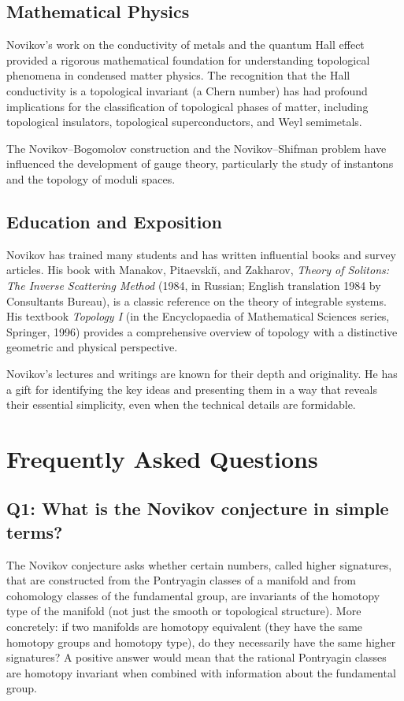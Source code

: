 \subsection{Mathematical Physics}

Novikov's work on the conductivity of metals and the quantum Hall effect provided a rigorous mathematical foundation for understanding topological phenomena in condensed matter physics. The recognition that the Hall conductivity is a topological invariant (a Chern number) has had profound implications for the classification of topological phases of matter, including topological insulators, topological superconductors, and Weyl semimetals.

The Novikov--Bogomolov construction and the Novikov--Shifman problem have influenced the development of gauge theory, particularly the study of instantons and the topology of moduli spaces.

\subsection{Education and Exposition}

Novikov has trained many students and has written influential books and survey articles. His book with Manakov, Pitaevski\u\i, and Zakharov, \textit{Theory of Solitons: The Inverse Scattering Method} (1984, in Russian; English translation 1984 by Consultants Bureau), is a classic reference on the theory of integrable systems. His textbook \textit{Topology I} (in the Encyclopaedia of Mathematical Sciences series, Springer, 1996) provides a comprehensive overview of topology with a distinctive geometric and physical perspective.

Novikov's lectures and writings are known for their depth and originality. He has a gift for identifying the key ideas and presenting them in a way that reveals their essential simplicity, even when the technical details are formidable.

\section{Frequently Asked Questions}

\subsection*{Q1: What is the Novikov conjecture in simple terms?}

The Novikov conjecture asks whether certain numbers, called higher signatures, that are constructed from the Pontryagin classes of a manifold and from cohomology classes of the fundamental group, are invariants of the homotopy type of the manifold (not just the smooth or topological structure). More concretely: if two manifolds are homotopy equivalent (they have the same homotopy groups and homotopy type), do they necessarily have the same higher signatures? A positive answer would mean that the rational Pontryagin classes are homotopy invariant when combined with information about the fundamental group.

